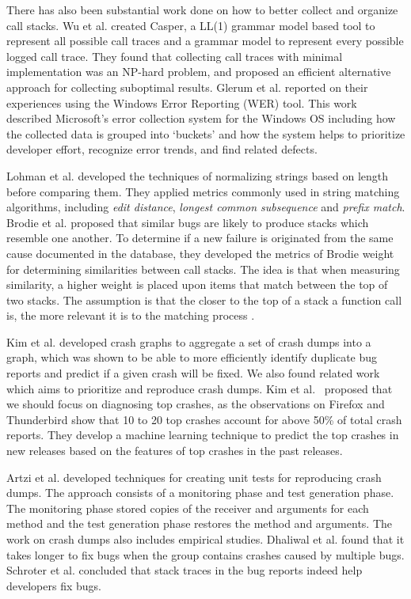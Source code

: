 \documentclass{llncs}
\begin{document}
There has also been substantial work done on how to better collect and organize call stacks. Wu et al.\cite{Wu:2016:CEA:2837614.2837619} created Casper, a LL(1) grammar model based tool to represent all possible call traces and a grammar model to represent every possible logged call trace. They found that collecting call traces with minimal implementation was an NP-hard problem, and proposed an efficient alternative approach for collecting suboptimal results. Glerum et al.\cite{Glerum:2009} reported on their experiences using the Windows Error Reporting (WER) tool. This work described Microsoft's error collection system for the Windows OS including how the collected data is grouped into `buckets' and how the system helps to prioritize developer effort, recognize error trends, and find related defects.


Lohman et al. \cite{Lohman:2005:QFK:1078027.1078461} developed the techniques of normalizing strings based on length before comparing them. They applied metrics commonly used in string matching algorithms, including {\it edit distance}, {\it longest common subsequence} and {\it prefix match}. Brodie et al. \cite{brodie:automated, brodie:quickly} proposed that similar bugs are likely to produce stacks which resemble one another. To determine if a new failure is originated from the same cause documented in the database, they developed the metrics of Brodie weight for determining similarities between call stacks. The idea is that when measuring similarity, a higher weight is placed upon items that match between the top of two stacks. The assumption is that the closer to the top of a stack a function call is, the more relevant it is to the matching process \cite{brodie:quickly}.

Kim et al.\cite{Kim:2011:2} developed crash graphs to aggregate a set of crash dumps into a graph, which was shown to be able to more efficiently identify duplicate bug reports and predict if a given crash will be fixed. We also found related work which aims to prioritize and reproduce crash dumps. Kim et al.~\cite{Kim:2011} proposed that we should focus on diagnosing top crashes, as the observations on Firefox and Thunderbird show that 10 to 20 top crashes account for above 50\% of total crash reports. They develop a machine learning technique to predict the top crashes in new releases based on the features of top crashes in the past releases.

Artzi et al. \cite{Artzi:2008} developed techniques for creating unit tests for reproducing crash dumps. The approach consists of a monitoring phase and test generation phase. The monitoring phase stored copies of the receiver and arguments for each method and the test generation phase restores the method and arguments. The work on crash dumps also includes empirical studies. Dhaliwal et al.\cite{Dhaliwal:2011:CFC:2117694.2119726} found that it takes longer to fix bugs when the group contains crashes caused by multiple bugs. Schroter et al.\cite{5463280} concluded that stack traces in the bug reports indeed help developers fix bugs.
\end{document}
